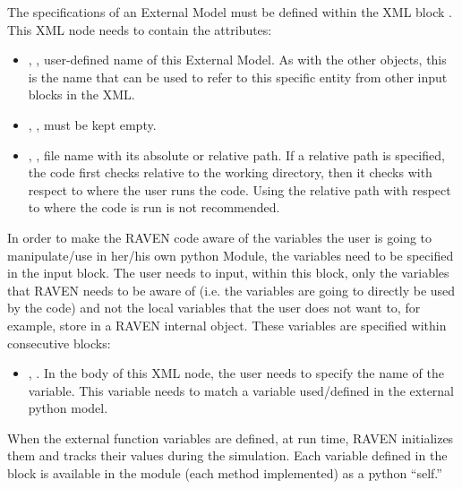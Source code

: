 The specifications of an External Model must be defined within the XML block
.
%
This XML node needs to contain the attributes:

\vspace{-5mm}
\begin{itemize}
  \itemsep0em
  \item {}, , user-defined name
  of this External Model.
  \nb As with the other objects, this is the name that can be used to refer to
  this specific entity from other input blocks in the XML.
  \item {}, , must be kept
  empty.
  \item {}, , file name
  with its absolute or relative path.
  \nb If a relative path is specified, the code first checks relative
  to the working directory, then it checks with respect to where the
  user runs the code.  Using the relative path with respect to where the
  code is run is not recommended.
\end{itemize}
\vspace{-5mm}

In order to make the RAVEN code aware of the variables the user is going to
manipulate/use in her/his own python Module, the variables need to be specified
in the  input block.
%
The user needs to input, within this block, only the variables that RAVEN needs
to be aware of (i.e. the variables are going to directly be used by the code)
and not the local variables that the user does not want to, for example, store
in a RAVEN internal object.
%
These variables are specified within consecutive  blocks:
\begin{itemize}
  \item {}, .
  In the body of this XML node, the user needs to specify the name of the
  variable.
  This variable needs to match a variable used/defined in the external python
  model.
\end{itemize}

When the external function variables are defined, at run time, RAVEN initializes
them and tracks their values during the simulation.
%
Each variable defined in the  block is available in the
module (each method implemented) as a python ``self.''
%

